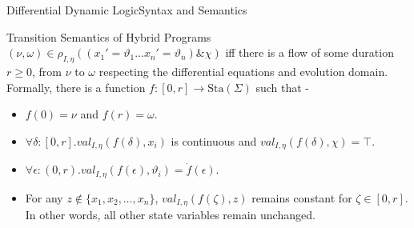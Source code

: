 \documentclass{beamer}
\newcommand{\val}[4]{\textit{val}_{#1, #2}(#3, #4)}
\newcommand{\transRel}[3]{\rho_{#1, #2}(#3)}
\newcommand{\transRelDef}[1]{\transRel{I}{\eta}{#1}}
\begin{document}
\begin{frame}{Differential Dynamic Logic}{Syntax and Semantics}
  \begin{block}{Transition Semantics of Hybrid Programs}
      $(\nu, \omega) \in \transRelDef{(x_1' = \vartheta_1 \ldots x_n' =
        \vartheta_n) \& \chi}$ iff there is a flow of some duration $r \geq 0$,
        from $\nu$ to $\omega$ respecting the differential equations and evolution
        domain. Formally, there is a function $f : [0,r] \to \text{Sta}(\Sigma)$ such that -
        \begin{itemize}
          \item $f(0) = \nu$ and $f(r) = \omega$.
          \item $\forall \delta : [0,r] . \val{I}{\eta}{f(\delta)}{x_i}$ is
            continuous and $\val{I}{\eta}{f(\delta)}{\chi} = \top$.
          \item  $\forall \epsilon : (0,r) .
            \val{I}{\eta}{f(\epsilon)}{\vartheta_i} = \dot{f}(\epsilon)$.
          \item For any $ z \not \in \{x_1, x_2, \ldots, x_n\} $,
            $\val{I}{\eta}{f(\zeta)}{z}$ remains constant for $\zeta \in [0,r]$.
            In other words, all other state variables remain unchanged.
        \end{itemize}
  \end{block}
\end{frame}
\end{document}
